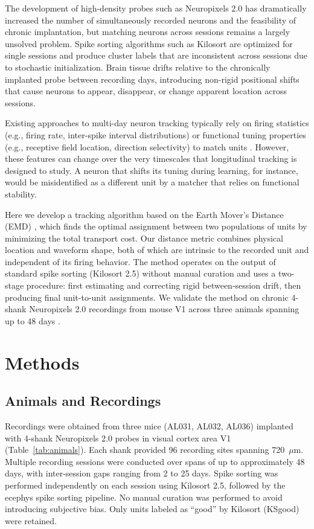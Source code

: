 \documentclass[12pt]{article}
\begin{document}
The development of high-density probes such as Neuropixels 2.0 \citep{steinmetz2021neuropixels} has dramatically increased the number of simultaneously recorded neurons and the feasibility of chronic implantation, but matching neurons across sessions remains a largely unsolved problem. Spike sorting algorithms such as Kilosort \citep{pachitariu2016kilosort} are optimized for single sessions and produce cluster labels that are inconsistent across sessions due to stochastic initialization. Brain tissue drifts relative to the chronically implanted probe between recording days, introducing non-rigid positional shifts that cause neurons to appear, disappear, or change apparent location across sessions.

Existing approaches to multi-day neuron tracking typically rely on firing statistics (e.g., firing rate, inter-spike interval distributions) or functional tuning properties (e.g., receptive field location, direction selectivity) to match units \citep{tolias2007recording}. However, these features can change over the very timescales that longitudinal tracking is designed to study. A neuron that shifts its tuning during learning, for instance, would be misidentified as a different unit by a matcher that relies on functional stability.

Here we develop a tracking algorithm based on the Earth Mover's Distance (EMD) \citep{rubner2000earth}, which finds the optimal assignment between two populations of units by minimizing the total transport cost. Our distance metric combines physical location and waveform shape, both of which are intrinsic to the recorded unit and independent of its firing behavior. The method operates on the output of standard spike sorting (Kilosort 2.5) without manual curation and uses a two-stage procedure: first estimating and correcting rigid between-session drift, then producing final unit-to-unit assignments. We validate the method on chronic 4-shank Neuropixels 2.0 recordings from mouse V1 across three animals spanning up to 48 days \citep{siegle2021survey}.

\section{Methods}

\subsection{Animals and Recordings}

Recordings were obtained from three mice (AL031, AL032, AL036) implanted with 4-shank Neuropixels 2.0 probes in visual cortex area V1 (Table~\ref{tab:animals}). Each shank provided 96 recording sites spanning 720~$\mu$m. Multiple recording sessions were conducted over spans of up to approximately 48 days, with inter-session gaps ranging from 2 to 25 days. Spike sorting was performed independently on each session using Kilosort 2.5, followed by the ecephys spike sorting pipeline. No manual curation was performed to avoid introducing subjective bias. Only units labeled as ``good'' by Kilosort (KSgood) were retained.
\end{document}
